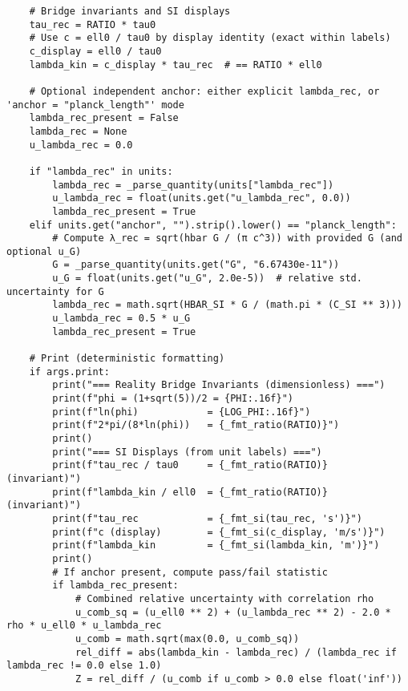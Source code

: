 \documentclass[11pt]{article}
\begin{document}
\begin{proposition}
\begin{verbatim}
    # Bridge invariants and SI displays
    tau_rec = RATIO * tau0
    # Use c = ell0 / tau0 by display identity (exact within labels)
    c_display = ell0 / tau0
    lambda_kin = c_display * tau_rec  # == RATIO * ell0

    # Optional independent anchor: either explicit lambda_rec, or 'anchor = "planck_length"' mode
    lambda_rec_present = False
    lambda_rec = None
    u_lambda_rec = 0.0

    if "lambda_rec" in units:
        lambda_rec = _parse_quantity(units["lambda_rec"])
        u_lambda_rec = float(units.get("u_lambda_rec", 0.0))
        lambda_rec_present = True
    elif units.get("anchor", "").strip().lower() == "planck_length":
        # Compute λ_rec = sqrt(hbar G / (π c^3)) with provided G (and optional u_G)
        G = _parse_quantity(units.get("G", "6.67430e-11"))
        u_G = float(units.get("u_G", 2.0e-5))  # relative std. uncertainty for G
        lambda_rec = math.sqrt(HBAR_SI * G / (math.pi * (C_SI ** 3)))
        u_lambda_rec = 0.5 * u_G
        lambda_rec_present = True

    # Print (deterministic formatting)
    if args.print:
        print("=== Reality Bridge Invariants (dimensionless) ===")
        print(f"phi = (1+sqrt(5))/2 = {PHI:.16f}")
        print(f"ln(phi)            = {LOG_PHI:.16f}")
        print(f"2*pi/(8*ln(phi))   = {_fmt_ratio(RATIO)}")
        print()
        print("=== SI Displays (from unit labels) ===")
        print(f"tau_rec / tau0     = {_fmt_ratio(RATIO)}  (invariant)")
        print(f"lambda_kin / ell0  = {_fmt_ratio(RATIO)}  (invariant)")
        print(f"tau_rec            = {_fmt_si(tau_rec, 's')}")
        print(f"c (display)        = {_fmt_si(c_display, 'm/s')}")
        print(f"lambda_kin         = {_fmt_si(lambda_kin, 'm')}")
        print()
        # If anchor present, compute pass/fail statistic
        if lambda_rec_present:
            # Combined relative uncertainty with correlation rho
            u_comb_sq = (u_ell0 ** 2) + (u_lambda_rec ** 2) - 2.0 * rho * u_ell0 * u_lambda_rec
            u_comb = math.sqrt(max(0.0, u_comb_sq))
            rel_diff = abs(lambda_kin - lambda_rec) / (lambda_rec if lambda_rec != 0.0 else 1.0)
            Z = rel_diff / (u_comb if u_comb > 0.0 else float('inf'))


\end{verbatim}
\end{proposition}
\end{document}
